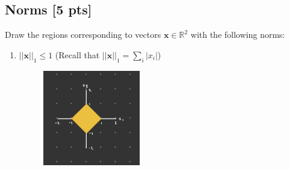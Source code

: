 \documentclass[a4paper]{article}
\theoremstyle{definition}
\newcommand{\RR}{\mathbb{R}}
\newenvironment{soln}{
	\leavevmode\color{blue}\ignorespaces
}{}
\begin{document}
	\subsection{Norms [5 pts]}
	Draw the regions corresponding to vectors $\mathbf{x}\in\RR^2$ with the following norms:
	\begin{enumerate}
		\item 	$||\mathbf{x}||_1\leq 1$ (Recall that $||\mathbf{x}||_1 = \sum_i |x_i|$)

	\begin{soln}
	    \begin{figure}[h!]
	        \centering
	        \includegraphics[width=0.4\textwidth]{plots/l1_norm.jpeg} 
	        \captionsetup{labelformat=empty}
	        \caption{}
	        \label{fig:l1_norm}
	    \end{figure}
	\end{soln}
		

\end{enumerate}
\end{document}
